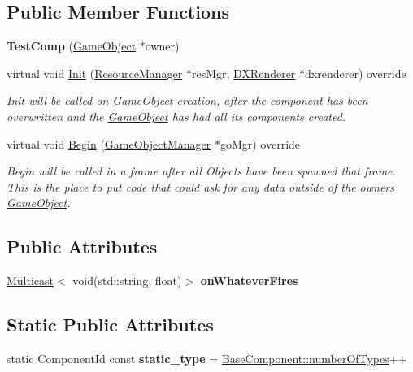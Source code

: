 \subsection*{Public Member Functions}
\begin{DoxyCompactItemize}
\item 
\mbox{\label{classTestComp_a19ad97466e2b3f489e24fdb274b3d3fc}} 
{\bfseries Test\+Comp} (\hyperlink{classGameObject}{Game\+Object} $\ast$owner)
\item 
virtual void \hyperlink{classTestComp_ab0a4222a9460892b8dddd358d2220c22}{Init} (\hyperlink{classResourceManager}{Resource\+Manager} $\ast$res\+Mgr, \hyperlink{classDXRenderer}{D\+X\+Renderer} $\ast$dxrenderer) override
\begin{DoxyCompactList}\small\item\em Init will be called on \hyperlink{classGameObject}{Game\+Object} creation, after the component has been overwritten and the \hyperlink{classGameObject}{Game\+Object} has had all its components created. \end{DoxyCompactList}\item 
virtual void \hyperlink{classTestComp_a3acda72ee2bf4b9b3e57972fa1a11ca9}{Begin} (\hyperlink{classGameObjectManager}{Game\+Object\+Manager} $\ast$go\+Mgr) override
\begin{DoxyCompactList}\small\item\em Begin will be called in a frame after all Objects have been spawned that frame. This is the place to put code that could ask for any data outside of the owner\textquotesingle{}s \hyperlink{classGameObject}{Game\+Object}. \end{DoxyCompactList}\end{DoxyCompactItemize}
\subsection*{Public Attributes}
\begin{DoxyCompactItemize}
\item 
\mbox{\label{classTestComp_a5baf20d3388f491c5a0732beb28f9de1}} 
\hyperlink{classMulticast}{Multicast}$<$ void(std\+::string, float)$>$ {\bfseries on\+Whatever\+Fires}
\end{DoxyCompactItemize}
\subsection*{Static Public Attributes}
\begin{DoxyCompactItemize}
\item 
\mbox{\label{classTestComp_a27e6134e1cf660d18254064447727744}} 
static Component\+Id const {\bfseries static\+\_\+type} = \hyperlink{classBaseComponent_a084ade347bc71a7f0d3b17ecdc2225a4}{Base\+Component\+::number\+Of\+Types}++
\end{DoxyCompactItemize}
